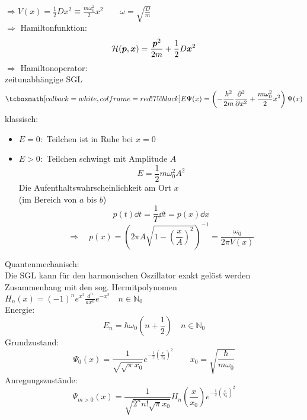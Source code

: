$ \Rightarrow V(x) = \frac{1}{2} D x^2 \equiv \frac{m \omega_0^2}{2} x^2 \qquad \omega = \sqrt{\frac{D}{m}} $\\
$ \Rightarrow $ Hamiltonfunktion:
$$ \mathcal{H}(\bm{p}, \bm{x}) = \frac{\bm{p}^2}{2m} + \frac{1}{2} D \bm{x}^2 $$
$ \Rightarrow $ Hamiltonoperator:\\
zeitunabhängige SGL
\begin{equation*}
\rmbox{ E \Psi(x) = \left(-\frac{\hbar^2}{2m} \prt{^2}{x^2} + \frac{m \omega_0^2}{2} x^2\right) \Psi(x) }
\end{equation*}
klassisch:
\begin{itemize}
	\item $ E = 0 : $ Teilchen ist in Ruhe bei $ x = 0 $
	\item $ E > 0 : $ Teilchen schwingt mit Amplitude $ A $
	\begin{equation*}
	E = \frac{1}{2} m \omega_0^2 A^2
	\end{equation*}
	Die Aufenthaltswahrscheinlichkeit am Ort $ x $\\
	(im Bereich von $ a $ bis $ b $)
	\begin{equation*}
	p(t) \dd t = \frac{1}{T} \dd t = p(x) \dd x
	\end{equation*}
	\begin{equation*}
	\Rightarrow \quad p(x) = \left(2 \pi A \sqrt{1 - \left(\frac{x}{A}\right)^2}\right)^{-1} = \frac{\omega_0}{2 \pi V(x)}
	\end{equation*}
\end{itemize}
Quantenmechanisch:\\[5pt]
Die SGL kann für den harmonischen Oszillator exakt gelöst werden\\
Zusammenhang mit den sog. Hermitpolynomen $ H_{n}(x) = (-1)^n e^{x^2} \frac{d^n}{a x^n} e^{-x^2} \quad n \in \mathbb{N}_0 $\\[5pt]
Energie:
$$ E_n = \hbar \omega_0 \left(n + \frac{1}{2}\right) \quad n \in \mathbb{N}_0 $$
Grundzustand:
$$ \Psi_0(x) = \frac{1}{\sqrt{\sqrt{\pi} x_0}} e^{-\frac{1}{2} \left(\frac{x}{x_0}\right)^2} \qquad x_0 = \sqrt{\frac{\hbar}{m \omega_0}} $$
Anregungszustände:
\begin{equation*}
\Psi_{m > 0} (x) = \frac{1}{\sqrt{2^n n! \sqrt{\pi} x_0}} H_n \left(\frac{x}{x_0}\right) e^{-\frac{1}{2} \left(\frac{x}{x_0}\right)^2}
\end{equation*}



